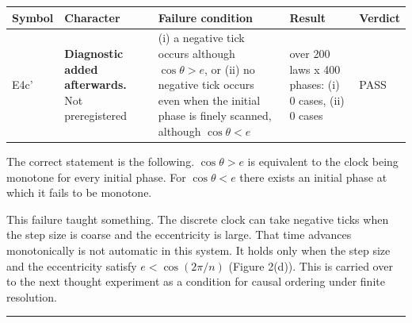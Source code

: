 \documentclass[
  a4paper,
]{article}
\newcounter{none} %
\begin{document}
{\def\LTcaptype{none} %
\begin{longtable}[]{@{}
  >{\raggedright\arraybackslash}p{}
  >{\raggedright\arraybackslash}p{}
  >{\raggedright\arraybackslash}p{}
  >{\raggedright\arraybackslash}p{}
  >{\raggedright\arraybackslash}p{}@{}}
\toprule\noalign{}
\begin{minipage}[b]{\linewidth}\raggedright
Symbol
\end{minipage} & \begin{minipage}[b]{\linewidth}\raggedright
Character
\end{minipage} & \begin{minipage}[b]{\linewidth}\raggedright
Failure condition
\end{minipage} & \begin{minipage}[b]{\linewidth}\raggedright
Result
\end{minipage} & \begin{minipage}[b]{\linewidth}\raggedright
Verdict
\end{minipage} \\
\midrule\noalign{}
\endhead
\bottomrule\noalign{}
\endlastfoot
E4c' & \textbf{Diagnostic added afterwards.} Not preregistered & (i) a
negative tick occurs although \(\cos\theta>e\), or (ii) no negative tick
occurs even when the initial phase is finely scanned, although
\(\cos\theta<e\) & over 200 laws x 400 phases: (i) 0 cases, (ii) 0 cases
& PASS \\
\end{longtable}
}

The correct statement is the following. \(\cos\theta>e\) is equivalent
to the clock being monotone for every initial phase. For
\(\cos\theta<e\) there exists an initial phase at which it fails to be
monotone.

This failure taught something. The discrete clock can take negative
ticks when the step size is coarse and the eccentricity is large. That
time advances monotonically is not automatic in this system. It holds
only when the step size and the eccentricity satisfy \(e<\cos(2\pi/n)\)
(Figure 2(d)). This is carried over to the next thought experiment as a
condition for causal ordering under finite resolution.

\begin{center}\rule{0.5\linewidth}{0.5pt}\end{center}
\end{document}

